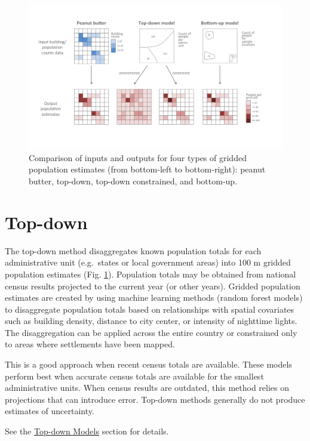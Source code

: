 \documentclass[]{book}
\begin{document}
\begin{figure}
\includegraphics[width=38.28in]{dat/gridded_population_estimates/pop_methods} \caption{Comparison of inputs and outputs for four types of gridded population estimates (from bottom-left to bottom-right): peanut butter, top-down, top-down constrained, and bottom-up.}\label{fig:pop-methods}
\end{figure}

\section{Top-down}\label{top-down}

The top-down method \citep{stevens2015disaggregating} disaggregates
known population totals for each administrative unit (e.g.~states or
local government areas) into 100 m gridded population estimates (Fig.
\ref{fig:pop-methods}). Population totals may be obtained from national
census results projected to the current year (or other years). Gridded
population estimates are created by using machine learning methods
(random forest models) to disaggregate population totals based on
relationships with spatial covariates such as building density, distance
to city center, or intensity of nighttime lights. The disaggregation can
be applied across the entire country or constrained only to areas where
settlements have been mapped.

This is a good approach when recent census totals are available. These
models perform best when accurate census totals are available for the
smallest administrative units. When census results are outdated, this
method relies on projections that can introduce error. Top-down methods
generally do not produce estimates of uncertainty.

See the \protect\hyperlink{top-down-models}{Top-down Models} section for
details.
\end{document}
